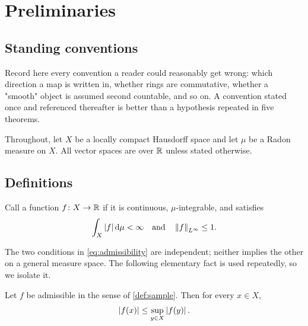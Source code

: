 
\section{Preliminaries}
\label{sec:preliminaries}

\subsection{Standing conventions}
\label{sec:conventions}

Record here every convention a reader could reasonably get wrong:
which direction a map is written in, whether rings are commutative,
whether a "smooth" object is assumed second countable, and so on.
A convention stated once and referenced thereafter is better than a
hypothesis repeated in five theorems.

\begin{convention}
\label{conv:standing}
Throughout, let $X$ be a locally compact Hausdorff space and let
$\mu$ be a Radon measure on $X$. All vector spaces are over $\mathbb{R}$
unless stated otherwise.
\end{convention}

\subsection{Definitions}

\begin{definition}
\label{def:sample}
Call a function $f \colon X \to \mathbb{R}$  if it is
continuous, $\mu$-integrable, and satisfies
\begin{equation}
\label{eq:admissibility}
  \int_X \left\lvert f \right\rvert \mathrm{d}\mu < \infty
  \quad\text{and}\quad
  \left\lVert f \right\rVert_{L^\infty} \le 1 .
\end{equation}
\end{definition}

The two conditions in \cref{eq:admissibility} are independent; neither
implies the other on a general measure space. The following elementary
fact is used repeatedly, so we isolate it.

\begin{lemma}
\label{lem:uniform-bound}
Let $f$ be admissible in the sense of \cref{def:sample}. Then for
every $x \in X$,
\begin{equation}
\label{eq:uniform-bound}
  \left\lvert f(x) \right\rvert \le \sup_{y \in X} \left\lvert f(y) \right\rvert .
\end{equation}
\end{lemma}

